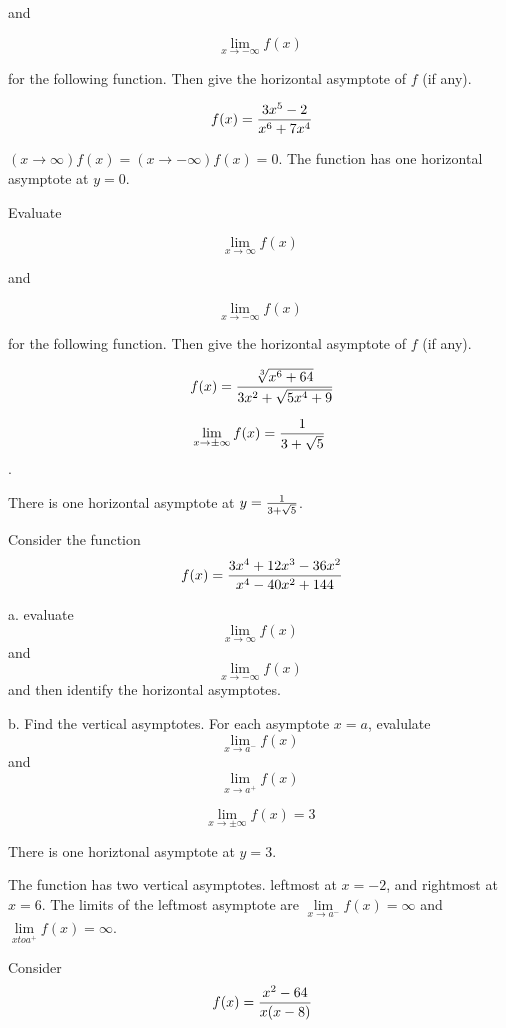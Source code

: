 and

$$\lim_{x \to -\infty}{f(x)}$$

for the following function. Then give the
horizontal asymptote of $f$ (if any).

$$\
f(x) = {
3x^5 - 2
\over
x^6 + 7x^4
}
$$

$(x \to \infty)f(x) = (x \to -\infty)f(x) = 0$. The function
has one horizontal asymptote at $y = 0$.

\bigskip


Evaluate

$$\lim_{x \to \infty}{f(x)}$$

and

$$\lim_{x \to -\infty}{f(x)}$$

for the following function. Then give the
horizontal asymptote of $f$ (if any).

$$\
f(x) = {
\root 3 \of {x^6 + 64}
\over
3x^2 + \sqrt {5x^4 + 9}
}
$$

\bigskip

$$\lim_{x \to \pm\infty}{f(x)} = {1 \over 3 + \sqrt{5}}$$.

There is one horizontal asymptote
at $y = {1 \over 3 + \sqrt{5}}$.

\bigskip

\bigskip

Consider the function
$$\
f(x) = {
3x^4 + 12x^3 - 36x^2
\over
x^4 - 40x^2 + 144
}
$$

\par a. evaluate $$\lim_{x \to \infty}{f(x)}$$ and
$$\lim_{x \to -\infty}{f(x)}$$ and then identify the horizontal
asymptotes.

\par b. Find the vertical asymptotes. For each asymptote $x = a$,
evalulate $$\lim_{x \to a^{-}}{f(x)}$$ and $$\lim_{x \to a^{+}}{f(x)}$$
\bigskip

\solution{2.5.73}
$$\lim_{x \to \pm\infty} f(x) = 3$$

\par There is one horiztonal asymptote at $y = 3$.

\par The function has two vertical asymptotes. leftmost
at $x = -2$, and rightmost at $x = 6$. The limits
of the leftmost asymptote are $\lim\limits_{x \to a^-} f(x) = \infty$
and $\lim\limits_{x to a^+} f(x) = \infty$.


Consider
$$\
f(x) = {
x^2 - 64
\over
x(x - 8)
}
$$

